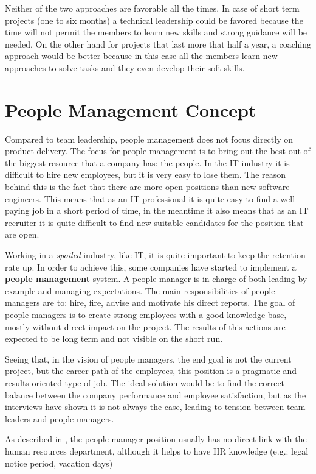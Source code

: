 Neither of the two approaches are favorable all the times. In case of short term projects (one to six months) a technical leadership could be favored because the time will not permit the members to learn new skills and strong guidance will be needed. On the other hand for projects that last more that half a year, a coaching approach would be better because in this case all the members learn new approaches to solve tasks and they even develop their soft-skills.

\section{People Management Concept}
\label{sec:proj-scope}
Compared to team leadership, people management does not focus directly on product delivery. The focus for people management is to bring out the best out of the biggest resource that a company has: the people. In the IT industry it is difficult to hire new employees, but it is very easy to lose them. The reason behind this is the fact that there are more open positions than new software engineers. This means that as an IT professional it is quite easy to find a well paying job in a short period of time, in the meantime it also means that as an IT recruiter it is quite difficult to find new suitable candidates for the position that are open. 

Working in a \textit{spoiled} industry, like IT, it is quite important to keep the retention rate up.  In order to achieve this, some companies have started to implement a \textbf{people management} system. A people manager is in charge of both leading by example and managing expectations. The main responsibilities of people managers are to: hire, fire, advise and motivate his direct reports. The goal of people managers is to create strong employees with a good knowledge base, mostly without direct impact on the project. The results of this actions are expected to be long term and not visible on the short run. 

Seeing that, in the vision of people managers, the end goal is not the current project, but the career path of the employees, this position is a pragmatic and results oriented type of job. The ideal solution would be to find the correct balance between the company performance and employee satisfaction, but as the interviews have shown it is not always the case, leading to tension between team leaders and people managers.

As described in \cite{abur-pm}, the people manager position usually has no direct link with the human resources department, although it helps to have HR knowledge (e.g.: legal notice period, vacation days)

